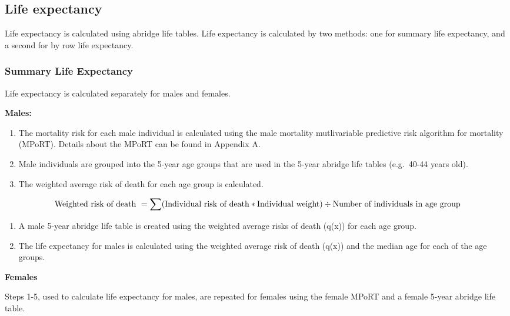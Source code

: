 \documentclass[]{book}
\begin{document}
\subsection{Life expectancy}\label{life-expectancy}

Life expectancy is calculated using abridge life tables. Life expectancy
is calculated by two methods: one for summary life expectancy, and a
second for by row life expectancy.

\subsubsection{Summary Life Expectancy}\label{summary-life-expectancy}

Life expectancy is calculated separately for males and females.

\textbf{Males:}

\begin{enumerate}
\def\labelenumi{\arabic{enumi}.}
\item
  The mortality risk for each male individual is calculated using the
  male mortality mutlivariable predictive risk algorithm for mortality
  (MPoRT). Details about the MPoRT can be found in Appendix A.
\item
  Male individuals are grouped into the 5-year age groups that are used
  in the 5-year abridge life tables (e.g.~40-44 years old).
\item
  The weighted average risk of death for each age group is calculated.
\end{enumerate}

\[ \text{Weighted risk of death } = \sum(\text{Individual risk of death}*\text{Individual weight}) \\ \div \text{Number of individuals in age group}\]

\begin{enumerate}
\def\labelenumi{\arabic{enumi}.}
\setcounter{enumi}{3}
\item
  A male 5-year abridge life table is created using the weighted average
  risks of death (q(x)) for each age group.
\item
  The life expectancy for males is calculated using the weighted average
  risk of death (q(x)) and the median age for each of the age groups.
\end{enumerate}

\textbf{Females}

Steps 1-5, used to calculate life expectancy for males, are repeated for
females using the female MPoRT and a female 5-year abridge life table.
\end{document}
